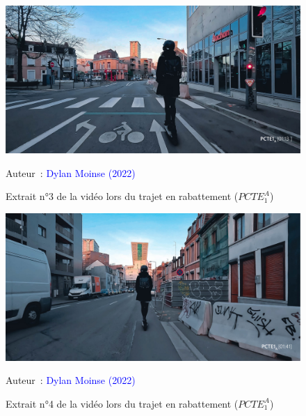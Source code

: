     \begin{figure}[h!]\vspace*{4pt}
        \caption*{Extrait n°3 de la vidéo lors du trajet en rabattement (\(PCTE^{A}_{1}\))}
        \centerline{\includegraphics[width=0.75\columnwidth]{src/Figures/Annexes/Extrait_Video_PCTE1_Access_3.jpg}}
        \vspace{5pt}
        \begin{flushright}\scriptsize{
        Auteur~: \textcolor{blue}{Dylan Moinse (2022)}
        }\end{flushright}
    \end{figure}

    \begin{figure}[h!]\vspace*{4pt}
        \caption*{Extrait n°4 de la vidéo lors du trajet en rabattement (\(PCTE^{A}_{1}\))}
        \centerline{\includegraphics[width=0.75\columnwidth]{src/Figures/Annexes/Extrait_Video_PCTE1_Access_4.jpg}}
        \vspace{5pt}
        \begin{flushright}\scriptsize{
        Auteur~: \textcolor{blue}{Dylan Moinse (2022)}
        }\end{flushright}
    \end{figure}

